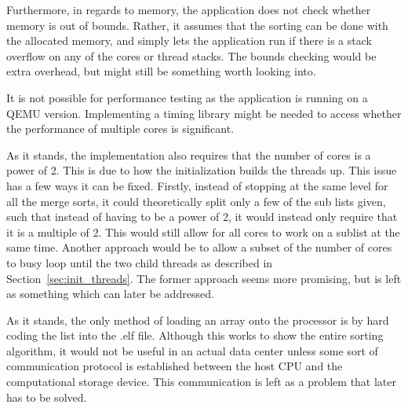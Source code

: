 Furthermore, in regards to memory, the application does not check whether memory
is out of bounds. Rather, it assumes that the sorting can be done with the
allocated memory, and simply lets the application run if there is a stack
overflow on any of the cores or thread stacks. The bounds checking would be
extra overhead, but might still be something worth looking into.

It is not possible for performance testing as the application is running on a
QEMU version. Implementing a timing library might be needed to access whether
the performance of multiple cores is significant.

As it stands, the implementation also requires that the number of cores is a
power of 2. This is due to how the initialization builds the threads up. This
issue has a few ways it can be fixed. Firstly, instead of stopping at the same
level for all the merge sorts, it could theoretically split only a few of the
sub lists given, such that instead of having to be a power of 2, it would instead
only require that it is a multiple of 2. This would still allow for all cores to
work on a sublist at the same time. Another approach would be to allow a subset
of the number of cores to busy loop until the two child threads as described in
Section~\ref{sec:init_threads}. The former approach seems more promising, but is
left as something which can later be addressed.

As it stands, the only method of loading an array onto the processor is by hard
coding the list into the .elf file. Although this works to show the entire
sorting algorithm, it would not be useful in an actual data center unless some
sort of communication protocol is established between the host CPU and the
computational storage device. This communication is left as a problem that later
has to be solved.




